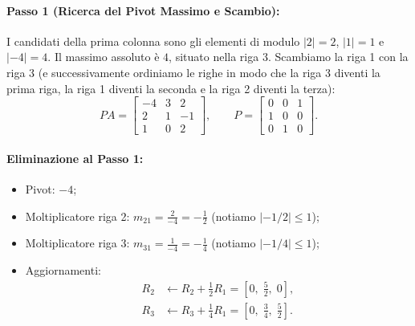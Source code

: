 \paragraph{Passo 1 (Ricerca del Pivot Massimo e Scambio):}
I candidati della prima colonna sono gli elementi di modulo $|2| = 2$, $|1| = 1$ e $|-4| = 4$.
Il massimo assoluto \`e $4$, situato nella riga 3.
Scambiamo la riga 1 con la riga 3 (e successivamente ordiniamo le righe in modo che la riga 3 diventi la prima riga, la riga 1 diventi la seconda e la riga 2 diventi la terza):
\begin{equation}
    PA = \begin{bmatrix}
        -4 & 3 & 2 \\
        2 & 1 & -1 \\
        1 & 0 & 2
    \end{bmatrix}, \qquad
    P = \begin{bmatrix}
        0 & 0 & 1 \\
        1 & 0 & 0 \\
        0 & 1 & 0
    \end{bmatrix}.
\end{equation}

\paragraph{Eliminazione al Passo 1:}
\begin{itemize}
    \item Pivot: $-4$;
    \item Moltiplicatore riga 2: $m_{21} = \frac{2}{-4} = -\frac{1}{2}$ (notiamo $|-1/2| \le 1$);
    \item Moltiplicatore riga 3: $m_{31} = \frac{1}{-4} = -\frac{1}{4}$ (notiamo $|-1/4| \le 1$);
    \item Aggiornamenti:
    \begin{align}
        R_2 &\leftarrow R_2 + \tfrac{1}{2} R_1 = \left[0, \; \tfrac{5}{2}, \; 0\right], \\
        R_3 &\leftarrow R_3 + \tfrac{1}{4} R_1 = \left[0, \; \tfrac{3}{4}, \; \tfrac{5}{2}\right].
    \end{align}
\end{itemize}


